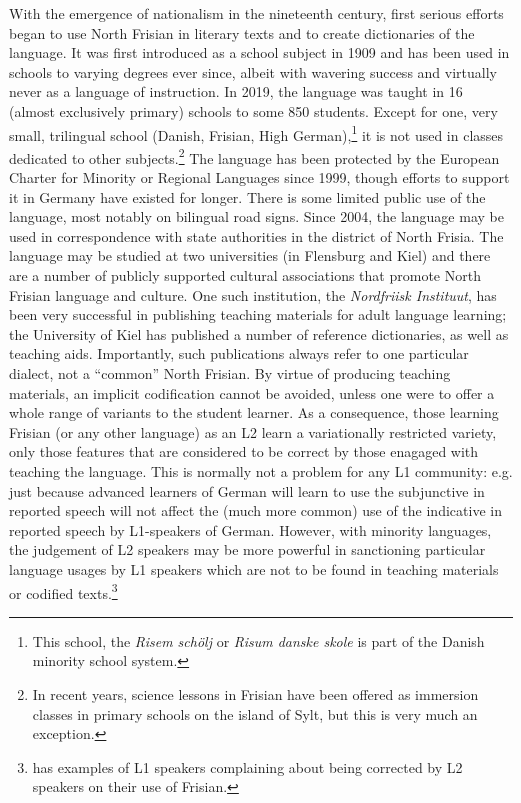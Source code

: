 \documentclass[output=paper]{langsci/langscibook}
\begin{document}
With the emergence of nationalism in the nineteenth century, first serious efforts began to use North Frisian in literary texts and to create dictionaries of the language. It was first introduced as a school subject in 1909 and has been used in schools to varying degrees ever since, albeit with wavering success and virtually never as a language of instruction. In 2019, the language was taught in 16 (almost exclusively primary) schools to some 850 students. Except for one, very small, trilingual school (Danish, Frisian, High German),\footnote{This school, the \textit{Risem schölj} or \textit{Risum danske skole} is part of the Danish minority school system.} it is not used in classes dedicated to other subjects.\footnote{In recent years, science lessons in Frisian have been offered as immersion classes in primary schools on the island of Sylt, but this is very much an exception.} The language has been protected by the European Charter for Minority or Regional Languages since 1999, though efforts to support it in Germany have existed for longer. There is some limited public use of the language, most notably on bilingual road signs. Since 2004, the language may be used in correspondence with state authorities in the district of North Frisia. The language may be studied at two universities (in Flensburg and Kiel) and there are a number of publicly supported cultural associations that promote North Frisian language and culture. One such institution, the \textit{Nordfriisk Instituut}, has been very successful in publishing teaching materials for adult language learning; the University of Kiel has published a number of reference dictionaries, as well as teaching aids. Importantly, such publications always refer to one particular dialect, not a “common” North Frisian. By virtue of producing teaching materials, an implicit codification cannot be avoided, unless one were to offer a whole range of variants to the student learner. As a consequence, those learning Frisian (or any other language) as an L2 learn a variationally restricted variety, only those features that are considered to be correct by those enagaged with teaching the language. This is normally not a problem for any L1 community: e.g. just because advanced learners of German will learn to use the subjunctive in reported speech will not affect the (much more common) use of the indicative in reported speech by L1-speakers of German. However, with minority languages, the judgement of L2 speakers may be more powerful in sanctioning particular language usages by L1 speakers which are not to be found in teaching materials or codified texts.\footnote{\citet{AdmiraalEtAl2019} has examples of L1 speakers complaining about being corrected by L2 speakers on their use of Frisian.}
\end{document}
